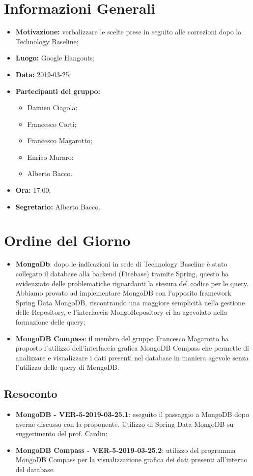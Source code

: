 \documentclass[a4paper, oneside, openany, dvipsnames, table]{article}
\begin{document}
\copertina{}


\newpage
\tableofcontents
\newpage
\section{Informazioni Generali}
\begin{itemize}
\item \textbf{Motivazione:} verbalizzare le scelte prese in seguito alle correzioni dopo la Technology Baseline;
\item \textbf{Luogo:} Google Hangouts;
\item \textbf{Data:} 2019-03-25;
\item \textbf{Partecipanti del gruppo:} \hfill
	\begin{itemize}
		\item Damien Ciagola;
		\item Francesco Corti;
		\item Francesco Magarotto;
		\item Enrico Muraro;
		\item Alberto Bacco.
	\end{itemize} 
\item \textbf{Ora:} 17:00;
\item \textbf{Segretario:} Alberto Bacco.
\end{itemize}

\section{Ordine del Giorno}
\begin{itemize}
	\item \textbf{MongoDb}: 
	dopo le indicazioni in sede di Technology Baseline è stato 
	collegato il database alla backend (Firebase) tramite Spring, questo ha evidenziato delle problematiche riguardanti la stesura
	del codice per le query. 
	Abbiamo provato ad implementare MongoDB con l'apposito framework Spring Data MongoDB, riscontrando
	una maggiore semplicità nella gestione delle Repository, e
	l'interfaccia MongoRepository ci ha agevolato nella 
	formazione delle query;
	\item \textbf{MongoDB Compass}: il membro del gruppo Francesco Magarotto ha proposto l'utilizzo dell'interfaccia grafica MongoDB Compass che permette di analizzare e visualizzare  i dati presenti nel database in maniera agevole senza l'utilizzo delle query di MongoDB. 
\end{itemize}

\subsection{Resoconto}
\begin{itemize}
	\item \textbf{MongoDB - VER-5-2019-03-25.1}: 
	eseguito il passaggio a MongoDB dopo averne discusso con la 
	proponente. Utilizzo di Spring Data MongoDB su suggerimento del prof. Cardin;
	\item \textbf{MongoDB Compass - VER-5-2019-03-25.2}:
	utilizzo del programma MongoDB Compass per la visualizzazione grafica dei dati presenti all'interno del database.
	
	
\end{itemize}
\end{document}
